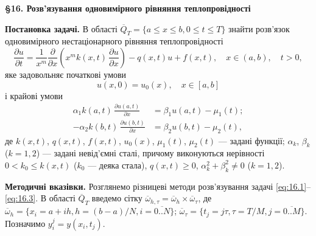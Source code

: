 \documentclass[12pt, a4paper]{article}
\newcommand{\ol}[1]{\overline{#1}}
\newcommand{\range}[2]{\ol{#1..#2}}
\renewcommand{\le}{\leqslant}
\renewcommand{\ge}{\geqslant}
\begin{document}
\textbf{\S 16. Розв'язування одновимірного рівняння теплопровідності} \medskip

\textbf{Постановка задачі.} В області $\ol Q_T = \{a \le x \le b, 0 \le t \le T\}$ знайти розв'язок одновимірного нестаціонарного рівняння теплопровідності
\begin{equation}
    \label{eq:16.1}
    \frac{\partial u}{\partial t} = \frac{1}{x^m} \frac{\partial}{\partial x} \left( x^m k(x, t) \, \frac{\partial u}{\partial x} \right) - q(x, t) u + f(x, t), \quad x \in (a, b), \quad t > 0,
\end{equation}
яке задовольняє початкові умови
\begin{equation}
    \label{eq:16.2}
    u(x, 0) = u_0(x), \quad x \in [a, b]
\end{equation}
і крайові умови
\begin{equation}
    \label{eq:16.3}
    \begin{aligned}
        \alpha_1 k(a, t) \, \frac{\partial u(a, t)}{\partial x} &= \beta_1 u(a, t) - \mu_1(t); \\
        -\alpha_2 k(b, t) \, \frac{\partial u(b, t)}{\partial x} &= \beta_2 u(b, t) - \mu_2(t),
    \end{aligned}
\end{equation}
де $k(x, t)$, $q(x, t)$, $f(x, t)$, $u_0(x)$, $\mu_1(t)$, $\mu_2(t)$ --- задані функції; $\alpha_k$, $\beta_k$ ($k=1,2$) --- задані невід'ємні сталі, причому виконуються нерівності $0 < k_0 \le k(x, t)$ ($k_0$ --- деяка стала), $q(x, t) \ge 0$, $\alpha_k^2 + \beta_k^2 \ne 0$ ($k=1,2$). \medskip

\textbf{Методичні вказівки.} Розглянемо різницеві методи розв'язування задачі \eqref{eq:16.1}--\eqref{eq:16.3}. В області $\ol Q_T$ введемо сітку $\ol \omega_{h, \tau} = \ol \omega_h \times \ol \omega_\tau$, де $\ol \omega_h = \{x_i = a + i h, h = (b - a)/N, i = \range{0}{N}\}$; $\ol \omega_\tau = \{t_j = j \tau, \tau = T/M, j = \range{0}{M}\}$. Позначимо $y_i^j = y(x_i, t_j)$. \medskip
\end{document}
